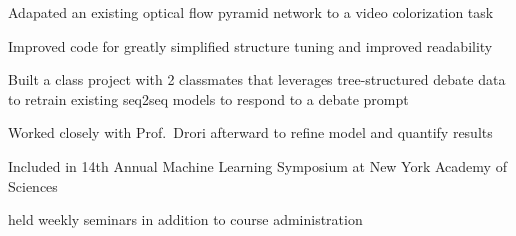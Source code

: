 \documentclass[letterpaper]{deedy-resume} %
\begin{document}
\begin{minipage}[t]{0.66\textwidth}
\sectionspace %



\begin{tightitemize}
    \item Adapated an existing optical flow pyramid network to a video colorization task
    \item Improved code for greatly simplified structure tuning and improved readability
\end{tightitemize}

\sectionspace %



\begin{tightitemize}
  \item Built a class project with 2 classmates that leverages tree-structured debate data to retrain existing seq2seq models to respond to a debate prompt
  \item Worked closely with Prof.\ Drori afterward to refine model and quantify results
  \item Included in 14th Annual Machine Learning Symposium at New York Academy of Sciences
\end{tightitemize}

\sectionspace %



\begin{tightitemize}
    \item  held weekly seminars in addition to course administration
\end{tightitemize}

\sectionspace %



\end{minipage}
\end{document}
